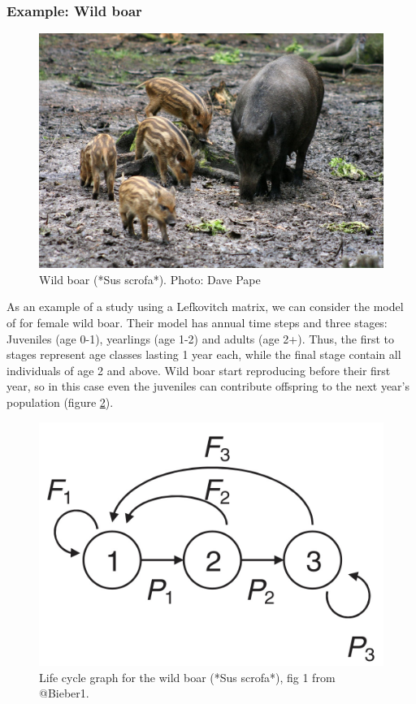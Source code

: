 \documentclass[
]{book}
\begin{document}
\hypertarget{example-wild-boar}{%
\subsubsection*{Example: Wild boar}\label{example-wild-boar}}

\begin{figure}
\includegraphics[width=0.6\linewidth]{Villsvin} \caption{Wild boar (*Sus scrofa*). Photo: Dave Pape}\label{fig:fig6}
\end{figure}

As an example of a study using a Lefkovitch matrix, we can consider the model of \citet{Bieber1} for female wild boar. Their model has annual time steps and three stages: Juveniles (age 0-1), yearlings (age 1-2) and adults (age 2+). Thus, the first to stages represent age classes lasting 1 year each, while the final stage contain all individuals of age 2 and above. Wild boar start reproducing before their first year, so in this case even the juveniles can contribute offspring to the next year's population (figure \ref{fig:wildboar}).

\begin{figure}
\includegraphics[width=0.6\linewidth]{LifeCycleBoar} \caption{Life cycle graph for the wild boar (*Sus scrofa*), fig 1 from @Bieber1.}\label{fig:wildboar}
\end{figure}
\end{document}
